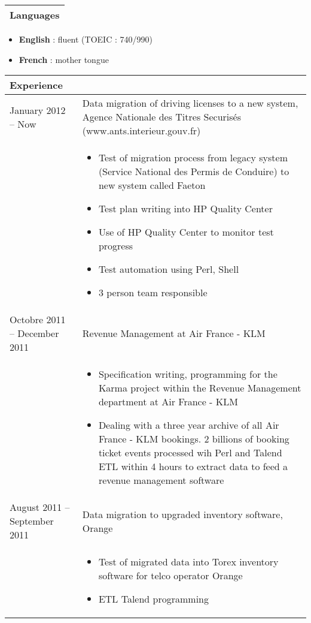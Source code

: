 \documentclass[a4paper,11pt]{article}
\begin{document}
\begin{tabular}{p{\textwidth}}
\hline
\textbf{Languages}\\
\hline
\end{tabular}
\begin{itemize}
\item    \textbf{English} : fluent (TOEIC : 740/990)
\item    \textbf{French} : mother tongue
\end{itemize}
\bigskip

\begin{longtable}{p{}p{}}
\hline
\textbf{Experience}\\
\hline
January 2012 -- Now & Data migration of driving licenses to a new system, Agence Nationale des Titres Securis\'es (www.ants.interieur.gouv.fr) \\
	

 & 
\begin{itemize}
\item Test of migration process from legacy system (Service National des Permis de Conduire) to new system called Faeton 
\item Test plan writing into HP Quality Center
\item Use of HP Quality Center to monitor test progress
\item Test automation using Perl, Shell
\item 3 person team responsible
\end{itemize} \\
	

Octobre 2011 -- December 2011 & Revenue Management at Air France - KLM \\

& \begin{itemize}
\item Specification writing, programming for the Karma project within the Revenue Management department at Air France - KLM
\item Dealing with a three year archive of all Air France - KLM bookings. 2 billions of booking ticket events processed wih Perl and Talend ETL within 4 hours to extract data to feed a revenue management software
\end{itemize} \\
	

August 2011 -- September 2011 & Data migration to upgraded inventory software, Orange \\
& \begin{itemize}
\item Test of migrated data into Torex inventory software for telco operator Orange
\item ETL Talend programming
\end{itemize} \\


\end{longtable}
\end{document}
